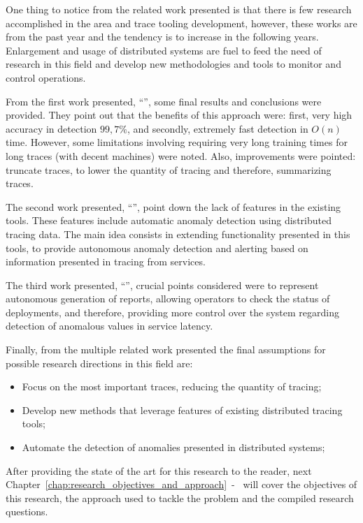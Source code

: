 One thing to notice from the related work presented is that there is few research accomplished in the area and trace tooling development, however, these works are from the past year and the tendency is to increase in the following years. Enlargement and usage of distributed systems are fuel to feed the need of research in this field and develop new methodologies and tools to monitor and control operations.

From the first work presented, ``'', some final results and conclusions were provided. They point out that the benefits of this approach were: first, very high accuracy in detection $99,7\%$, and secondly, extremely fast detection in $O(n)$ time. However, some limitations involving requiring very long training times for long traces (with decent machines) were noted. Also, improvements were pointed: truncate traces, to lower the quantity of tracing and therefore, summarizing traces.

The second work presented, ``'', point down the lack of features in the existing tools. These features include automatic anomaly detection using distributed tracing data. The main idea consists in extending functionality presented in this tools, to provide autonomous anomaly detection and alerting based on information presented in tracing from services.

The third work presented, ``'', crucial points considered were to represent autonomous generation of reports, allowing operators to check the status of deployments, and therefore, providing more control over the system regarding detection of anomalous values in service latency.

Finally, from the multiple related work presented the final assumptions for possible research directions in this field are:

\begin{itemize}
    \item Focus on the most important traces, reducing the quantity of tracing;
    \item Develop new methods that leverage features of existing distributed tracing tools;
    \item Automate the detection of anomalies presented in distributed systems;
\end{itemize}

After providing the state of the art for this research to the reader, next Chapter~\ref{chap:research_objectives_and_approach}~-~ will cover the objectives of this research, the approach used to tackle the problem and the compiled research questions.

\checkoddpage
{}
{
    \newpage
    \blankpage
}
{
}